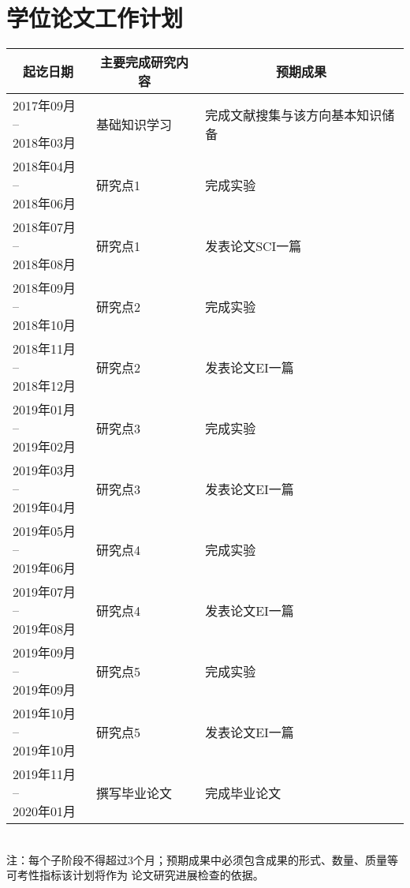 



\section{学位论文工作计划}
{
\noindent
\begin{tabular*}{0.999\textwidth}{| p{ } <{\centering} | p{}  | p{}  |}

	\hline
	\multicolumn{1}{|c|}{起讫日期} & 	\multicolumn{1}{c}{主要完成研究内容} & 	\multicolumn{1}{|c|}{预期成果} \\
	\hline
	\makecell{2017年09月 -- \\2018年03月}   &  基础知识学习 &   完成文献搜集与该方向基本知识储备 \\
	\hline
	\makecell{2018年04月 -- \\2018年06月} &  研究点1 &   完成实验 \\
	\hline
	\makecell{2018年07月 -- \\2018年08月} &  研究点1 &   发表论文SCI一篇 \\
	\hline
	\makecell{2018年09月 -- \\2018年10月} &  研究点2 &   完成实验 \\
	\hline
    \makecell{2018年11月 -- \\2018年12月} &  研究点2 &   发表论文EI一篇 \\
    \hline
    \makecell{2019年01月 -- \\2019年02月} &  研究点3 &   完成实验 \\
    \hline
    \makecell{2019年03月 -- \\2019年04月} &  研究点3 &   发表论文EI一篇 \\
    \hline
    \makecell{2019年05月 -- \\2019年06月} &  研究点4 &   完成实验 \\
    \hline
    \makecell{2019年07月 -- \\2019年08月} &  研究点4 &   发表论文EI一篇 \\
    \hline
    \makecell{2019年09月 -- \\2019年09月} &  研究点5 &   完成实验 \\
    \hline
    \makecell{2019年10月 -- \\2019年10月} &  研究点5 &   发表论文EI一篇 \\
    \hline
	\makecell{2019年11月 -- \\2020年01月} &  撰写毕业论文 &  完成毕业论文 \\
	\hline
\end{tabular*}
\\[1 cm]
{\songti 注：每个子阶段不得超过3个月；预期成果中必须包含成果的形式、数量、质量等可考性指标该计划将作为
论文研究进展检查的依据。}
\indent
}



